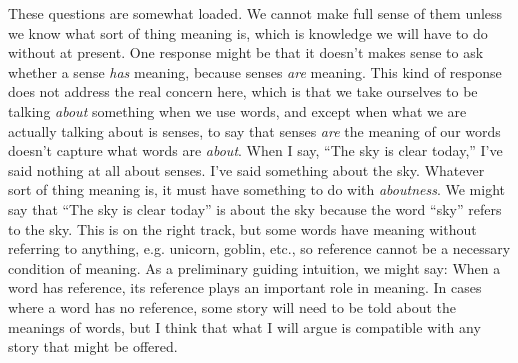 \documentclass[12pt]{amsart}
\begin{document}
These questions are somewhat loaded. We cannot make full sense of them unless we know what sort of thing meaning is, which is knowledge we will have to do without at present. One response might be that it doesn't makes sense to ask whether a sense \emph{has} meaning, because senses \emph{are} meaning. This kind of response does not address the real concern here, which is that we take ourselves to be talking \emph{about} something when we use words, and except when what we are actually talking about is senses, to say that senses \emph{are} the meaning of our words doesn't capture what words are \emph{about}. When I say, ``The sky is clear today,'' I've said nothing at all about senses. I've said something about the sky. Whatever sort of thing meaning is, it must have something to do with \emph{aboutness}. We might say that ``The sky is clear today'' is about the sky because the word ``sky'' refers to the sky. This is on the right track, but some words have meaning without referring to anything, e.g. unicorn, goblin, etc., so reference cannot be a necessary condition of meaning. As a preliminary guiding intuition, we might say: When a word has reference, its reference plays an important role in meaning. In cases where a word has no reference, some story will need to be told about the meanings of words, but I think that what I will argue is compatible with any story that might be offered.
\end{document}
